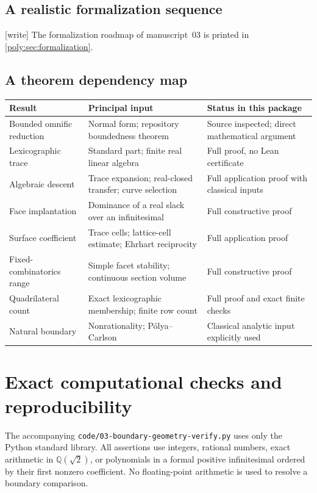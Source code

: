 \documentclass[11pt,a4paper]{article}
\numberwithin{equation}{section}
\theoremstyle{plain}
\newcommand{\wtag}{\textup{[write]}}%
\newcommand{\Q}{\mathbb Q}
\newcommand{\pathcode}[1]{\nolinkurl{#1}}
\begin{document}
\subsection{A realistic formalization sequence}\label{poly:ehr:sec:lean-pointer}
\wtag{} The formalization roadmap of manuscript~03 is printed in
\cref{poly:sec:formalization}.

\subsection{A theorem dependency map}

\begin{center}
\small
\begin{tabular}{p{}p{}p{}}
\toprule
Result & Principal input & Status in this package\\
\midrule
Bounded omnific reduction & Normal form; repository boundedness theorem
 & Source inspected; direct mathematical argument\\[3pt]
Lexicographic trace & Standard part; finite real linear algebra
 & Full proof, no Lean certificate\\[3pt]
Algebraic descent & Trace expansion; real-closed transfer; curve selection
 & Full application proof with classical inputs\\[3pt]
Face implantation & Dominance of a real slack over an infinitesimal
 & Full constructive proof\\[3pt]
Surface coefficient & Trace cells; lattice-cell estimate; Ehrhart reciprocity
 & Full application proof\\[3pt]
Fixed-combinatorics range & Simple facet stability; continuous section volume
 & Full constructive proof\\[3pt]
Quadrilateral count & Exact lexicographic membership; finite row count
 & Full proof and exact finite checks\\[3pt]
Natural boundary & Nonrationality; P\'olya--Carlson
 & Classical analytic input explicitly used\\
\bottomrule
\end{tabular}
\end{center}

\section{Exact computational checks and reproducibility}\label{poly:ehr:sec:verification}

The accompanying \pathcode{code/03-boundary-geometry-verify.py} uses only the Python standard library.
All assertions use integers, rational numbers, exact arithmetic in
$\Q(\sqrt2)$, or polynomials in a formal positive infinitesimal ordered by
their first nonzero coefficient. No floating-point arithmetic is used to
resolve a boundary comparison.
\end{document}
